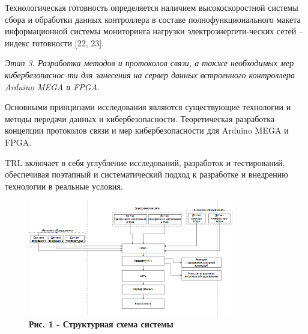 \begin{multicols}{2}
Технологическая готовность определяется наличием высокоскоростной
системы сбора и обработки данных контроллера в составе
полнофункционального макета информационной системы мониторинга нагрузки
электроэнергети-ческих сетей -- индекс готовности {[}22, 23{]}.

\emph{Этап 3. Разработка методов и протоколов связи, а также необходимых
мер кибербезопаснос-ти для занесения на сервер данных встроенного
контроллера Arduino MEGA и FPGA.}

Основными принципами исследования являются существующие технологии и
методы передачи данных и кибербезопасности. Теоретическая разработка
концепции протоколов связи и мер кибербезопасности для Arduino MEGA и
FPGA.

TRL включает в себя углубление исследований, разработок и тестирований,
обеспечивая поэтапный и систематический подход к разработке и внедрению
технологии в реальные условия.
\end{multicols}

\begin{figure}[H]
	\centering
	\includegraphics[width=0.8\textwidth]{assets/148}
	\caption*{\bfseries Рис. 1 - Структурная схема системы}
\end{figure}

